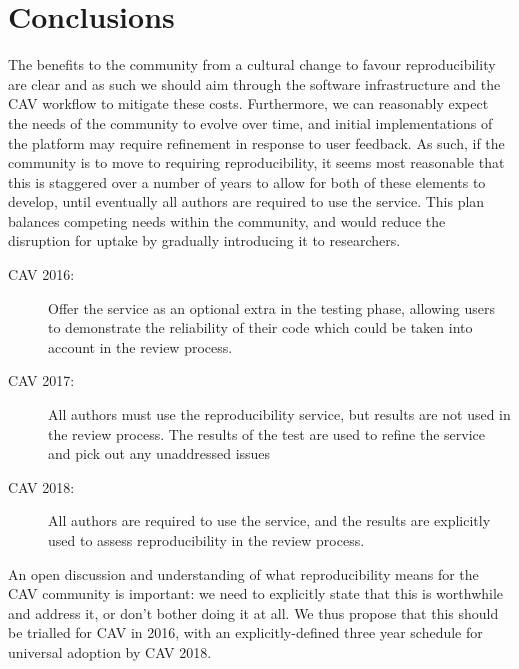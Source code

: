 \documentclass[conference]{IEEEtran}
\begin{document}
\section{Conclusions}\label{concl}

The benefits to the community from a cultural change to favour
reproducibility are clear and as such we should aim through the
software infrastructure and the CAV workflow to mitigate these
costs. Furthermore, we can reasonably expect the needs of the
community to evolve over time, and initial implementations of the
platform may require refinement in response to user feedback. As such,
if the community is to move to requiring reproducibility, it seems
most reasonable that this is staggered over a number of years to allow
for both of these elements to develop, until eventually all authors
are required to use the service. This plan balances competing needs
within the community, and would reduce the disruption for uptake by
gradually introducing it to researchers.

\begin{description}
\item[CAV 2016:] Offer the service as an optional extra in the testing
phase, allowing users to demonstrate the reliability of their code
which could be taken into account in the review process.
\item[CAV 2017:] All authors must use the reproducibility service, but
results are not used in the review process. The results of the test
are used to refine the service and pick out any unaddressed issues
\item[CAV 2018:] All authors are required to use the service, and the
results are explicitly used to assess reproducibility in the review
process.
\end{description}

An open discussion and understanding of what reproducibility means for
the CAV community is important: we need to explicitly state that this
is worthwhile and address it, or don't bother doing it at all. We thus
propose that this should be trialled for CAV in 2016, with an
explicitly-defined three year schedule for universal adoption by CAV
2018.







\end{document}
